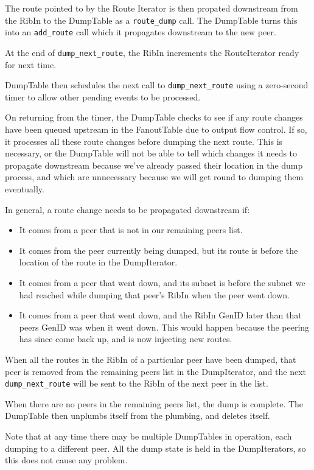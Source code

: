 \documentclass[11pt]{article}
\begin{document}
The route pointed to by the Route Iterator is then propated downstream
from the RibIn to the DumpTable as a {\tt route\_dump} call.  The
DumpTable turns this into an {\tt add\_route} call which it propagates
downstream to the new peer.

At the end of {\tt dump\_next\_route}, the RibIn increments the
RouteIterator ready for next time.  

DumpTable then schedules the next call to {\tt dump\_next\_route} using a
zero-second timer to allow other pending events to be processed.

On returning from the timer, the DumpTable checks to see if any route
changes have been queued upstream in the FanoutTable due to output
flow control.  If so, it processes all these route changes before
dumping the next route.  This is necessary, or the DumpTable will not
be able to tell which changes it needs to propagate downstream because
we've already passed their location in the dump process, and which are
unnecessary because we will get round to dumping them eventually.

In general, a route
change needs to be propagated downstream if:
\begin{itemize}
\item It comes from a peer that is not in our remaining peers list.
\item It comes from the peer currently being dumped, but its route is
before the location of the route in the DumpIterator.
\item It comes from a peer that went down, and its subnet is before the
subnet we had reached while dumping that peer's RibIn when the peer
went down.
\item It comes from a peer that went down, and the RibIn GenID later
than that peers GenID was when it went down.  This would happen
because the peering has since come back up, and is now injecting new
routes.
\end{itemize}

When all the routes in the RibIn of a particular peer have been
dumped, that peer is removed from the remaining peers list in the
DumpIterator, and the next {\tt dump\_next\_route} will be sent to the RibIn
of the next peer in the list.

When there are no peers in the remaining peers list, the dump is
complete.  The DumpTable then unplumbs itself from the plumbing, and
deletes itself.

Note that at any time there may be multiple DumpTables in operation,
each dumping to a different peer.  All the dump state is held in the
DumpIterators, so this does not cause any problem.
\end{document}
